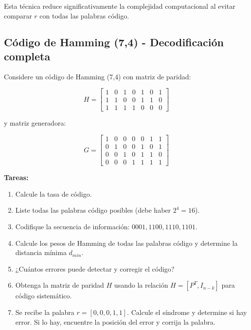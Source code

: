 \documentclass[10pt,a4paper]{article}
\begin{document}
\begin{solucion}
Esta técnica reduce significativamente la complejidad computacional al evitar comparar $r$ con todas las palabras código.
\end{solucion}

\subsection{Código de Hamming (7,4) - Decodificación completa}

\begin{ejercicio}
Considere un código de Hamming (7,4) con matriz de paridad:

\[
H = \begin{bmatrix}
1 & 0 & 1 & 0 & 1 & 0 & 1 \\
1 & 1 & 0 & 0 & 1 & 1 & 0 \\
1 & 1 & 1 & 1 & 0 & 0 & 0
\end{bmatrix}
\]

y matriz generadora:

\[
G = \begin{bmatrix}
1 & 0 & 0 & 0 & 0 & 1 & 1 \\
0 & 1 & 0 & 0 & 1 & 0 & 1 \\
0 & 0 & 1 & 0 & 1 & 1 & 0 \\
0 & 0 & 0 & 1 & 1 & 1 & 1
\end{bmatrix}
\]

\textbf{Tareas:}
\begin{enumerate}
\item Calcule la tasa de código.
\item Liste todas las palabras código posibles (debe haber $2^4 = 16$).
\item Codifique la secuencia de información: $0001, 1100, 1110, 1101$.
\item Calcule los pesos de Hamming de todas las palabras código y determine la distancia mínima $d_{min}$.
\item ¿Cuántos errores puede detectar y corregir el código?
\item Obtenga la matriz de paridad $H$ usando la relación $H = [P^T, I_{n-k}]$ para código sistemático.
\item Se recibe la palabra $r = [0, 0, 0, 1, 1]$. Calcule el síndrome y determine si hay error. Si lo hay, encuentre la posición del error y corrija la palabra.
\end{enumerate}
\end{ejercicio}
\end{document}
